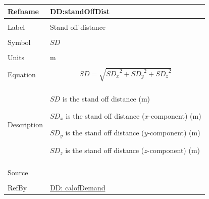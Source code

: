 \documentclass[12pt]{article}
\begin{document}
\noindent \begin{minipage}{\textwidth}
          \begin{tabular}{>{\raggedright}p{}>{\raggedright\arraybackslash}p{}}
          \toprule \textbf{Refname} & \textbf{DD:standOffDist}
          \label{DD:standOffDist}
          \\ \midrule \\
          Label & Stand off distance
          \\ \midrule \\
          Symbol & $SD$
          \\ \midrule \\
          Units & m
          \\ \midrule \\
          Equation & \begin{displaymath}
                     SD=\sqrt{{SD_{x}}^{2}+{SD_{y}}^{2}+{SD_{z}}^{2}}
                     \end{displaymath}
          \\ \midrule \\
          Description & \begin{symbDescription}
                        \item{$SD$ is the stand off distance (m)}
                        \item{${SD_{x}}$ is the stand off distance ($x$-component) (m)}
                        \item{${SD_{y}}$ is the stand off distance ($y$-component) (m)}
                        \item{${SD_{z}}$ is the stand off distance ($z$-component) (m)}
                        \end{symbDescription}
          \\ \midrule \\
          Source & \cite{astm2009}
          \\ \midrule \\
          RefBy & \hyperref[DD:calofDemand]{DD: calofDemand}
          \\ \bottomrule
          \end{tabular}
          \end{minipage}
\par~
\end{document}

